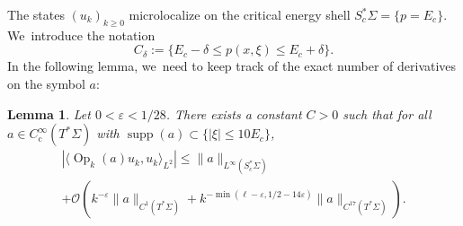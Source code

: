 \documentclass[JEP,XML,SOM,Unicode,published]{cedram}
\theoremstyle{plain}
\newtheorem{lemma}[theorem]{Lemma}
\theoremstyle{definition}
\let\mc\mathcal
\let\eps\varepsilon
\DeclareMathOperator{\comp}{c}
\DeclareMathOperator{\Op}{Op}
\DeclareMathOperator{\supp}{supp}
\begin{document}
The states $(u_k)_{k \geq 0}$ microlocalize on the critical energy shell $S^*_c\Sigma = \{p=E_c\}$. We~introduce the notation
\[
C_\delta := \{ E_c-\delta \leq p(x,\xi) \leq E_c + \delta\}.
\]
In the following lemma, we~need to keep track of the exact number of derivatives on the symbol $a$:

\begin{lemma}
\label{lemma:2}
Let $0 < \eps < 1/28$. There exists a constant $C > 0$ such that for all $a \in C^\infty_{\comp}(T^*\Sigma)$ with $\supp(a) \subset \{|\xi| \leq 10E_c\}$,
\begin{multline*}
|\langle\Op_k(a)u_k,u_k\rangle_{L^2}|\leq \|a\|_{L^\infty(S^*_c\Sigma)} \\
+ \mc{O}(k^{-\eps} \|a\|_{C^1(T^*\Sigma)} + k^{-\min(\ell-\eps, 1/2-14\eps)}\|a\|_{C^{17}(T^*\Sigma)}).
\end{multline*}
\end{lemma}
\end{document}
